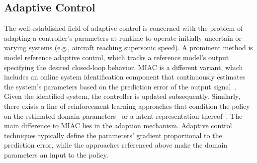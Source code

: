 \documentclass[utf8]{frontiersSCNS} %
\begin{document}
\subsection{Adaptive Control}
\label{sec_sota_adaptive_control}
The well-established field of adaptive control is concerned with the problem of adapting a controller's parameters at runtime to operate initially uncertain or varying systems (e.g., aircraft reaching supersonic speed).
A prominent method is model reference adaptive control, which tracks a reference model's output specifying the desired closed-loop behavior.
\ac{MIAC} is a different variant, which includes an online system identification component that continuously estimates the system's parameters based on the prediction error of the output signal~\citep{Astrom_Wittenmark_08,Landau_Karimi_11}.
Given the identified system, the controller is updated subsequently.
Similarly, there exists a line of \simtoreal reinforcement learning approaches that condition the policy on the estimated domain parameters~\citep{Yu_Turk_17,Yu_Turk_19,Mozifian_Dudek_20} or a latent representation thereof~\citep{Yu_Liu_19,Peng_Levine_20,Kumar_Malik_21}.
The main difference to \ac{MIAC} lies in the adaption mechanism.
Adaptive control techniques typically define the parameters' gradient  proportional to the prediction error, while the approaches referenced above make the domain parameters an input to the policy.


\end{document}
